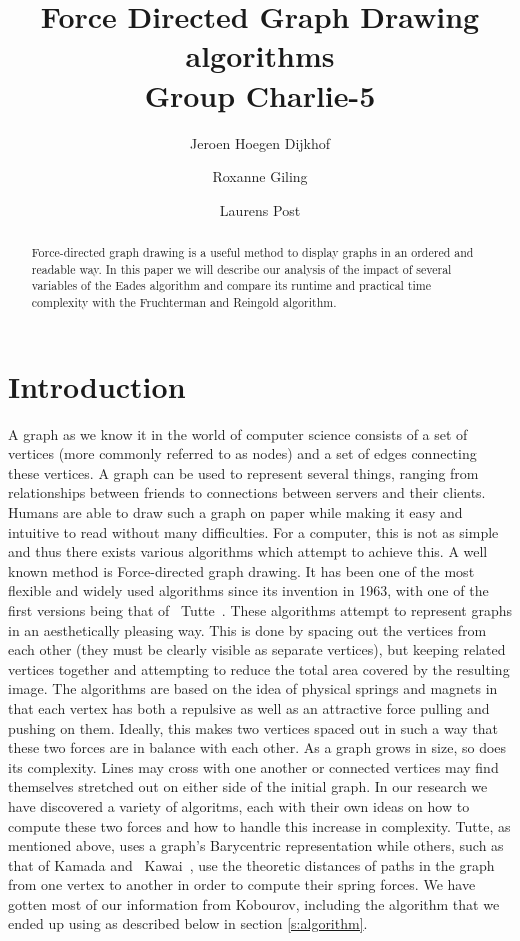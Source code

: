 \documentclass[a4paper,12pt]{article}
\begin{document}
\title{Force Directed Graph Drawing algorithms\\ \bigskip \large{Group Charlie-5}}
\author{Jeroen Hoegen Dijkhof \and Roxanne Giling \and Laurens Post}
\maketitle
\begin{abstract}
Force-directed graph drawing is a useful method to display graphs in an ordered and readable way. In this paper we will describe our analysis of the impact of several variables of the Eades algorithm and compare its runtime and practical time complexity with the Fruchterman and Reingold algorithm.
\end{abstract}
\newpage

\section{Introduction}\label{s:Introduction}
A graph as we know it in the world of computer science consists of a set of vertices (more commonly referred to as nodes) and a set of edges connecting these vertices\cite{Graph}. A graph can be used to represent several things, ranging from relationships between friends to connections between servers and their clients. Humans are able to draw such a graph on paper while making it easy and intuitive to read without many difficulties. For a computer, this is not as simple and thus there exists various algorithms which attempt to achieve this. A well known method is Force-directed graph drawing. It has been one of the most flexible and widely used algorithms since its invention in 1963, with one of the first versions being that of ~Tutte~\cite{Tutte}. These algorithms attempt to represent graphs in an aesthetically pleasing way. This is done by spacing out the vertices from each other (they must be clearly visible as separate vertices), but keeping related vertices together and attempting to reduce the total area covered by the resulting image. The algorithms are based on the idea of physical springs and magnets in that each vertex has both a repulsive as well as an attractive force pulling and pushing on them. Ideally, this makes two vertices spaced out in such a way that these two forces are in balance with each other. As a graph grows in size, so does its complexity. Lines may cross with one another or connected vertices may find themselves stretched out on either side of the initial graph. In our research we have discovered a variety of algoritms, each with their own ideas on how to compute these two forces and how to handle this increase in complexity. Tutte, as mentioned above, uses a graph's Barycentric representation while others, such as that of Kamada and ~Kawai~\cite{Kawai}, use the theoretic distances of paths in the graph from one vertex to another in order to compute their spring forces. We have gotten most of our information from Kobourov\cite{Kobourov}, including the algorithm that we ended up using as described below in section \ref{s:algorithm}.
\end{document}
